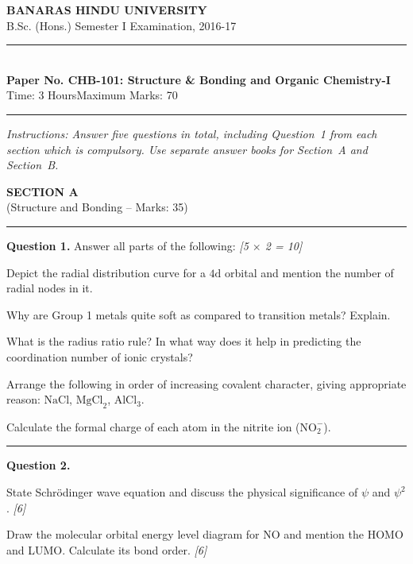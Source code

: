 \documentclass[11pt,a4paper]{article}
\newcommand{\pts}[1]{\hfill   \textit{[#1]}}
\begin{document}
\begin{center}
  {\large\bfseries BANARAS HINDU UNIVERSITY}\\[2pt]
  {\normalsize B.Sc. (Hons.) Semester I Examination, 2016-17}\\[6pt]
  \rule{0.8\linewidth}{0.5pt}\\[6pt]
  {\large\bfseries Paper No. CHB-101: Structure \& Bonding and Organic Chemistry-I}\\[4pt]
  {\normalsize Time: 3 Hours\hfill Maximum Marks: 70}
\end{center}
\rule{\linewidth}{0.4pt}
\small



\noindent   \textit{Instructions: Answer five questions in total, including Question~1 from each section which is compulsory. Use separate answer books for Section~A and Section~B.}

\normalsize
\bigskip


\begin{center}
  {\large\bfseries SECTION A}\\[2pt]
  {\normalsize (Structure and Bonding -- Marks: 35)}
\end{center}
\rule{0.4\linewidth}{0.2pt}
\smallskip




\noindent   \textbf{Question 1.} Answer all parts of the following: \pts{5 $ \times$ 2 = 10}

\begin{parts}
  \item Depict the radial distribution curve for a $4 \text{d}$ orbital and mention the number of radial nodes in it.
  \item Why are Group 1 metals quite soft as compared to transition metals? Explain.
  \item What is the radius ratio rule? In what way does it help in predicting the coordination number of ionic crystals?
  \item Arrange the following in order of increasing covalent character, giving appropriate reason: $ \text{NaCl}$, $ \text{MgCl}_2$, $ \text{AlCl}_3$.
  \item Calculate the formal charge of each atom in the nitrite ion ($ \text{NO}_2^-$).
\end{parts}

\medskip\rule{\linewidth}{0.2pt}




\noindent   \textbf{Question 2.}

\begin{parts}
  \item State Schr\"odinger wave equation and discuss the physical significance of $\psi$ and $\psi^2$. \pts{6}
  \item Draw the molecular orbital energy level diagram for $ \text{NO}$ and mention the HOMO and LUMO. Calculate its bond order. \pts{6}
\end{parts}
\end{document}
